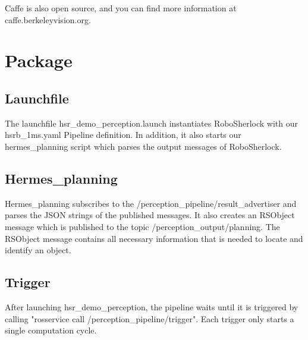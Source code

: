 \documentclass[main.tex]{subfiles}
\begin{document}
 	Caffe is also open source, and you can find more information at caffe.berkeleyvision.org.\\
 	
 	\section{Package}
 	\subsection{Launchfile}
 	The launchfile hsr\_demo\_perception.launch instantiates RoboSherlock with our hsrb\_1ms.yaml Pipeline definition.
 	In addition, it also starts our hermes\_planning script which parses the output messages of RoboSherlock.
 	
 	\subsection{Hermes\_planning}
 	Hermes\_planning subscribes to the /perception\_pipeline/result\_advertiser and parses the JSON strings of the published messages.
 	It also creates an RSObject message which is published to the topic /perception\_output/planning.
 	The RSObject message contains all necessary information that is needed to locate and identify an object.
 	
 	\subsection{Trigger}
 	After launching  hsr\_demo\_perception, the pipeline waits until it is triggered by calling "rosservice call /perception\_pipeline/trigger".
 	Each trigger only starts a single computation cycle.
 	
\end{document}
